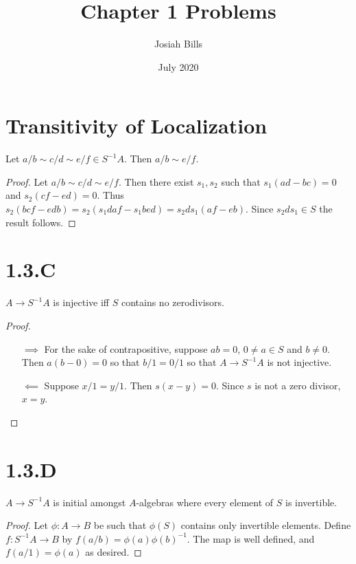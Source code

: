 \documentclass{article}
\title{Chapter 1 Problems}
\author{Josiah Bills}
\date{July 2020}
\begin{document}
\maketitle

\section{Transitivity of Localization}
\begin{theorem}
    Let $a/b \sim c/d \sim e/f \in S^{-1}A$. Then $a/b \sim e/f$.
\end{theorem}
\begin{proof}
    Let $a/b \sim c/d \sim e/f$. Then there exist $s_1, s_2$ such that
    $s_1(ad-bc)=0$ and $s_2(cf-ed)=0$. Thus $s_2(bcf-edb)=s_2(s_1daf-s_1bed)=s_2ds_1(af-eb)$.
    Since $s_2ds_1 \in S$ the result follows.
\end{proof}

\section{1.3.C}
\begin{theorem}
    $A \to S^{-1}A$ is injective iff $S$ contains no
    zerodivisors.
\end{theorem}
\begin{proof}
    \hfill
    \begin{itemize}
        \item[$\implies$] For the sake of contrapositive, suppose $ab=0$,
            $0 \neq a \in S$ and $b \neq 0$. Then $a(b-0)=0$
            so that $b/1=0/1$ so that $A \to S^{-1}A$ is not injective.
        \item[$\impliedby$] Suppose $x/1=y/1$. Then $s(x-y)=0$. Since
            $s$ is not a zero divisor, $x=y$.
    \end{itemize}
\end{proof}

\section{1.3.D}
\begin{theorem}
    $A \to S^{-1}A$ is initial amongst $A$-algebras where
    every element of $S$ is invertible.
\end{theorem}
\begin{proof}
    Let $\phi: A \to B$ be such that $\phi(S)$ contains only
    invertible elements. Define $f : S^{-1}A \to B$ by $f(a/b)=\phi(a)\phi(b)^{-1}$.
    The map is well defined, and $f(a/1)=\phi(a)$ as desired.
\end{proof}
\end{document}
